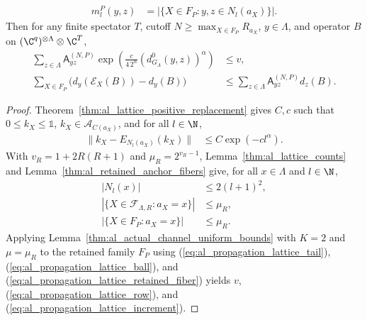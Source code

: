 \begin{lemma}
\begin{align}
        m_l^P(y,z) & =|\{X\in F_P:y,z\in N_l(a_X)\}|.
    \end{align}
    Then for any finite spectator $T$, cutoff $N\ge\max_{X\in F_P}R_{a_X}$,
    $y\in\Lambda$, and operator $B$ on $(\C^q)^{\otimes\Lambda}\otimes\C^T$,
    \begin{align}
        \label{eq:al_propagation_lattice_row}
        \sum_{z\in\Lambda}\mathsf A^{(N,P)}_{yz}
        \exp\left(\frac{c}{4\,2^\alpha}
        (d_{G_\Lambda}^0(y,z))^\alpha\right)
         & \le v,                                             \\
        \label{eq:al_propagation_lattice_increment}
        \sum_{X\in F_P}
        \bigl(d_y(\mathcal E_X(B))-d_y(B)\bigr)
         & \le\sum_{z\in\Lambda}\mathsf A^{(N,P)}_{yz}d_z(B).
    \end{align}
\end{lemma}
\begin{proof}
    \leanok
    Theorem~\ref{thm:al_lattice_positive_replacement} gives $C,c$ such that
    $0\le k_X\le\mathbb 1$, $k_X\in\mathcal A_{C(a_X)}$, and for all $l\in\N$,
    \begin{align}
        \label{eq:al_propagation_lattice_tail}
        \|k_X-E_{N_l(a_X)}(k_X)\|
         & \le C\exp(-cl^\alpha).
    \end{align}
    With $v_R=1+2R(R+1)$ and $\mu_R=2^{v_R-1}$,
    Lemma~\ref{thm:al_lattice_counts} and
    Lemma~\ref{thm:al_retained_anchor_fibers} give, for all $x\in\Lambda$
    and $l\in\N$,
    \begin{align}
        \label{eq:al_propagation_lattice_ball}
        |N_l(x)|                               & \le2(l+1)^2, \\
        \label{eq:al_propagation_lattice_fiber}
        |\{X\in\mathcal F_{\Lambda,R}:a_X=x\}| & \le\mu_R,    \\
        \label{eq:al_propagation_lattice_retained_fiber}
        |\{X\in F_P:a_X=x\}|                   & \le\mu_R.
    \end{align}
    Applying Lemma~\ref{thm:al_actual_channel_uniform_bounds} with $K=2$ and
    $\mu=\mu_R$ to the retained family $F_P$ using
    (\ref{eq:al_propagation_lattice_tail}),
    (\ref{eq:al_propagation_lattice_ball}), and
    (\ref{eq:al_propagation_lattice_retained_fiber}) yields $v$,
    (\ref{eq:al_propagation_lattice_row}), and
    (\ref{eq:al_propagation_lattice_increment}).
\end{proof}

